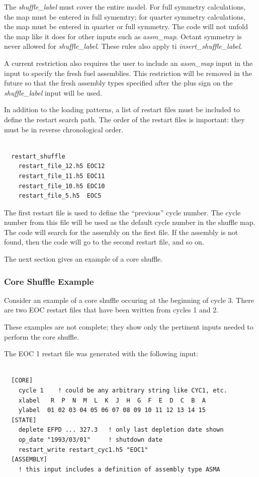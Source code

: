 The {\it shuffle\_label} must cover the entire model.  For full symmetry calculations, the map
must be entered in full symemtry; for quarter symmetry calculations, the map must be entered in
quarter or full symmetry.  The code will not unfold the map like it does for other inputs such
as {\it assm\_map}.  Octant symmetry is never allowed for {\it shuffle\_label}.  These rules
also apply ti {\it insert\_shuffle\_label}.

A current restriction also requires the user to include an {\it assm\_map} input
in the input to specify the fresh fuel assemblies. This restriction will be removed in the
future so that the fresh assembly types specified after the plus sign on the {\it shuffle\_label} input will be used.

In addition to the loading patterns, a list of restart files must be included to
define the restart search path. The order of the restart files is important: they
must be in reverse chronological order.
\begin{Verbatim}[fontsize=\small]

  restart_shuffle
    restart_file_12.h5 EOC12
    restart_file_11.h5 EOC11
    restart_file_10.h5 EOC10
    restart_file_5.h5  EOC5

\end{Verbatim}
The first restart file is used to define the ``previous'' cycle number. The cycle number
from this file will be used as the default cycle number in the shuffle map.
The code will search for the assembly on the first file. If the assembly is not found, then
the code will go to the second restart file, and so on.

The next section gives an example of a core shuffle.

\subsubsection{Core Shuffle Example}\label{sec:core-shuffle-example}

Consider an example of a core shuffle occuring at the beginning of cycle 3.
There are two EOC restart files that have been written from cycles 1 and 2.

These examples are not complete; they show only the pertinent inputs needed
to perform the core shuffle.

The EOC 1 restart file was generated with the following input:
\begin{Verbatim}[fontsize=\small]

  [CORE]
    cycle 1    ! could be any arbitrary string like CYC1, etc.
    xlabel   R  P  N  M  L  K  J  H  G  F  E  D  C  B  A
    ylabel  01 02 03 04 05 06 07 08 09 10 11 12 13 14 15
  [STATE]
    deplete EFPD ... 327.3   ! only last depletion date shown
    op_date "1993/03/01"     ! shutdown date
    restart_write restart_cyc1.h5 "EOC1"
  [ASSEMBLY]
    ! this input includes a definition of assembly type ASMA

\end{Verbatim}

